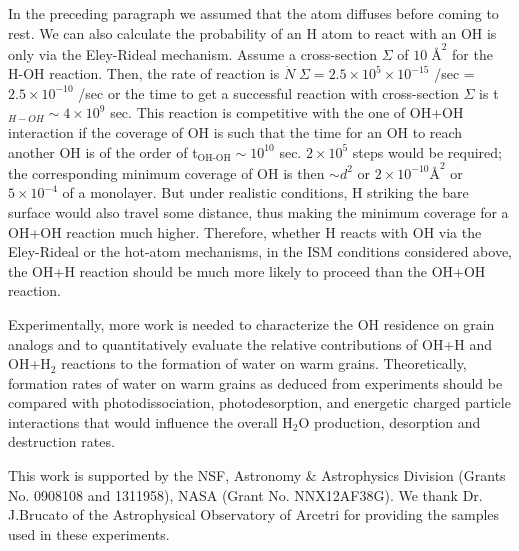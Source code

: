 \documentclass[iop]{emulateapj}
\begin{document}
In the preceding paragraph we assumed that the atom diffuses before coming to rest.  We can also calculate the probability of an H atom to react with an OH is only via the Eley-Rideal mechanism. Assume a cross-section $\Sigma$ of $10 \;\text{\AA}^2$ for the H-OH reaction. Then, the rate of reaction is $\dot{N} \; \Sigma = 2.5\times10^5 \times 10^{-15}$ /sec = $2.5\times10^{-10}$ /sec or the time to get a successful reaction with cross-section $\Sigma$ is t $_{H-OH} \sim 4\times10^9$ sec. This reaction is competitive with the one of OH+OH interaction if the coverage of OH is such that the time for an OH to reach another OH is of the order of t$_{\text{OH-OH}} \sim 10^{10}$ sec.  $2\times10^5$ steps would be required; the corresponding minimum coverage of OH  is then $\sim d^2$ or $2\times10^{-10}\text{\AA}^2$ or $5\times10^{-4}$ of a monolayer. But under realistic conditions, H striking the bare surface would also travel some distance, thus making the minimum coverage for a OH+OH reaction much higher. Therefore, whether H reacts with OH via the Eley-Rideal or the hot-atom mechanisms, in the ISM conditions considered above, the OH+H reaction should be much more likely to proceed than the OH+OH reaction.

Experimentally, more work is needed to characterize the OH residence on grain analogs and to quantitatively evaluate the relative contributions of OH+H and OH+H$_2$ reactions to the formation of water on warm grains. Theoretically, formation rates of water on warm grains as deduced from experiments should be compared with photodissociation, photodesorption, and energetic charged particle interactions that would influence the overall H$_2$O production, desorption and destruction rates.

\acknowledgments
This work is supported by the NSF, Astronomy \& Astrophysics Division (Grants No. 0908108 and 1311958), NASA (Grant No. NNX12AF38G). We thank Dr. J.Brucato of the Astrophysical Observatory of Arcetri for providing the samples used in these experiments.
  


\end{document}

